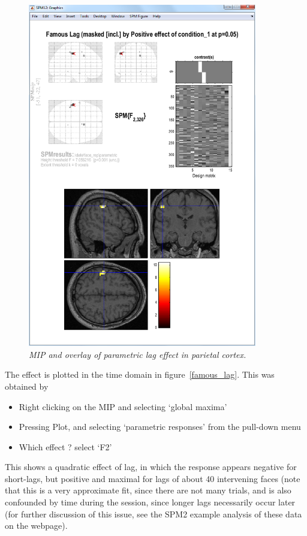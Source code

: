 \documentclass[a4paper,titlepage]{book}
\newcommand{\bi}{\begin{itemize}}
\newcommand{\ei}{\end{itemize}}
\begin{document}
\begin{figure}
\begin{center}
\includegraphics[width=100mm]{faces/famous_lag_mip}
\caption{\em MIP and overlay of parametric lag effect in parietal cortex. \label{famous_lag_mip} }
\end{center}
\end{figure}
The effect is plotted in the time domain in figure~\ref{famous_lag}. This was obtained by
\bi
\item{Right clicking on the MIP and selecting `global maxima'}
\item{Pressing Plot, and selecting `parametric responses' from the pull-down menu}
\item{Which effect ? select `F2'}
\ei

This shows a quadratic effect of lag, in which the response appears negative for short-lags, but positive and maximal for lags of about 40 intervening faces (note that this is a very approximate fit, since there are not many trials, and is also confounded by time during the session, since longer lags necessarily occur later (for further discussion of this issue, see the SPM2 example analysis of these data on the webpage).
\end{document}
